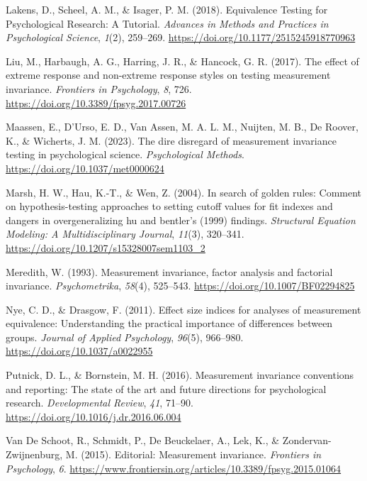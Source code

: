 \documentclass[
  man]{apa7}
\newlength{\cslhangindent}
\newlength{\cslentryspacingunit} %
\newenvironment{CSLReferences}[2] %
 {%
  \setlength{\parindent}{0pt}
  \ifodd #1
  \let\oldpar\par
  \def\par{\hangindent=\cslhangindent\oldpar}
  \fi
  \setlength{\parskip}{#2\cslentryspacingunit}
 }%
 {}
\begin{document}
\begin{CSLReferences}{1}{0}
\leavevmode{}%
Lakens, D., Scheel, A. M., \& Isager, P. M. (2018). Equivalence Testing for Psychological Research: A Tutorial. \emph{Advances in Methods and Practices in Psychological Science}, \emph{1}(2), 259--269. \url{https://doi.org/10.1177/2515245918770963}

\leavevmode{}%
Liu, M., Harbaugh, A. G., Harring, J. R., \& Hancock, G. R. (2017). The effect of extreme response and non-extreme response styles on testing measurement invariance. \emph{Frontiers in Psychology}, \emph{8}, 726. \url{https://doi.org/10.3389/fpsyg.2017.00726}

\leavevmode{}%
Maassen, E., D'Urso, E. D., Van Assen, M. A. L. M., Nuijten, M. B., De Roover, K., \& Wicherts, J. M. (2023). The dire disregard of measurement invariance testing in psychological science. \emph{Psychological Methods}. \url{https://doi.org/10.1037/met0000624}

\leavevmode{}%
Marsh, H. W., Hau, K.-T., \& Wen, Z. (2004). In search of golden rules: Comment on hypothesis-testing approaches to setting cutoff values for fit indexes and dangers in overgeneralizing hu and bentler's (1999) findings. \emph{Structural Equation Modeling: A Multidisciplinary Journal}, \emph{11}(3), 320--341. \url{https://doi.org/10.1207/s15328007sem1103_2}

\leavevmode{}%
Meredith, W. (1993). Measurement invariance, factor analysis and factorial invariance. \emph{Psychometrika}, \emph{58}(4), 525--543. \url{https://doi.org/10.1007/BF02294825}

\leavevmode{}%
Nye, C. D., \& Drasgow, F. (2011). Effect size indices for analyses of measurement equivalence: Understanding the practical importance of differences between groups. \emph{Journal of Applied Psychology}, \emph{96}(5), 966--980. \url{https://doi.org/10.1037/a0022955}

\leavevmode{}%
Putnick, D. L., \& Bornstein, M. H. (2016). Measurement invariance conventions and reporting: The state of the art and future directions for psychological research. \emph{Developmental Review}, \emph{41}, 71--90. \url{https://doi.org/10.1016/j.dr.2016.06.004}

\leavevmode{}%
Van De Schoot, R., Schmidt, P., De Beuckelaer, A., Lek, K., \& Zondervan-Zwijnenburg, M. (2015). Editorial: Measurement invariance. \emph{Frontiers in Psychology}, \emph{6}. \url{https://www.frontiersin.org/articles/10.3389/fpsyg.2015.01064}


\end{CSLReferences}
\end{document}
